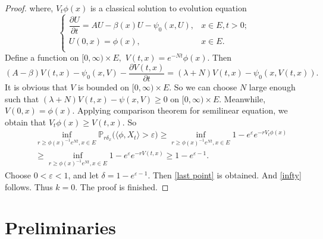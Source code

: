 \documentclass[12pt,a4paper]{amsart}
\numberwithin{equation}{section}
\theoremstyle{plain}
\theoremstyle{definition}
\theoremstyle{remark}
\begin{document}
\begin{proof}
	where, $V_t\phi(x)$ is a classical solution to evolution equation
	\begin{equation}\label{eq diff}
	\begin{cases}
	\dfrac{\partial U}{\partial t}=AU-\beta(x)U-\psi_0(x, U),& x\in E, t>0;\\
	U(0,x)=\phi(x),& x\in E.\\
	\end{cases}
	\end{equation}
	Define a function on $[0,\infty)\times E,$ $V(t,x)=e^{-Nt}\phi(x).$  Then
	\[
	(A-\beta)V(t,x)-\psi_0(x, V)-\frac{\partial V(t,x)}{\partial t}=(\lambda +N)V(t,x)-\psi_0(x,V(t,x)).
	\]
	It is obvious that $V$ is bounded on $[0,\infty)\times E$.  So we can choose $N$ large enough such that $(\lambda+N)V(t,x)-\psi(x,V)\geq 0$ on $[0,\infty)\times E.$
	Meanwhile, $V(0,x)=\phi(x)$.  Applying comparison theorem for semilinear equation, we obtain that $V_t\phi(x)\geq V(t,x)$.  So
	\begin{eqnarray*}
		&&\inf_{r\geq \phi(x)^{-1}e^{Nt}, x\in E}\mathbb P_{r\delta_x}\big(\langle\phi, X_t \rangle >\varepsilon\big)\geq \inf_{r\geq \phi(x)^{-1}e^{Nt}, x\in E} 1-e^{\varepsilon}e^{-rV_t\phi(x)}\\
		&&\geq \inf_{r\geq \phi(x)^{-1}e^{Nt}, x\in E} 1-e^{\varepsilon}e^{-rV(t,x)}
		\geq 1-e^{\varepsilon-1}.
	\end{eqnarray*}
	Choose $0<\varepsilon<1$, and let $\delta=1-e^{\varepsilon-1}$.  Then \eqref{last point} is obtained. And
	\eqref{infty} follows. Thus $k=0$. The proof is finished.
\end{proof}


\section{Preliminaries}
\end{document}
